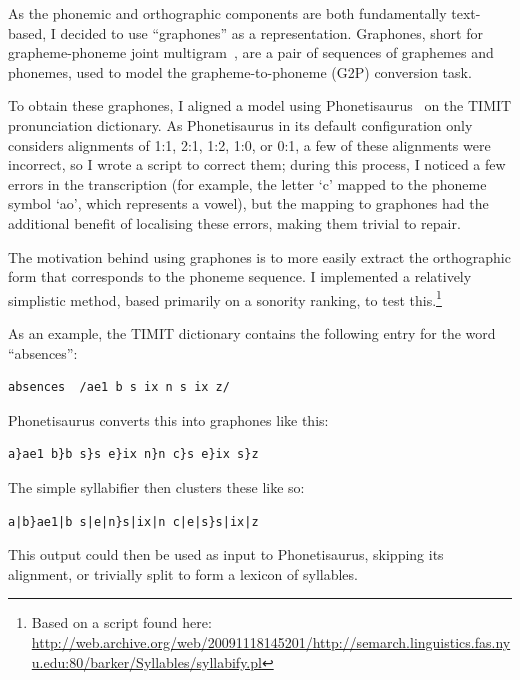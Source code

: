 \documentclass{article}[11pt]
\begin{document}
As the phonemic and orthographic components are both fundamentally text-based, I decided to use ``graphones'' as a representation. Graphones, short for grapheme-phoneme joint multigram~\citep{bisani_investigations_2002}, are a pair of sequences of graphemes and phonemes, used to model the grapheme-to-phoneme (G2P) conversion task.

To obtain these graphones, I aligned a model using Phonetisaurus~\citep{novak_phonetisaurus_2016} on the TIMIT pronunciation dictionary. As Phonetisaurus in its default configuration only considers alignments of 1:1, 2:1, 1:2, 1:0, or 0:1, a few of these alignments were incorrect, so I wrote a script to correct them; during this process, I noticed a few errors in the transcription (for example, the letter `c' mapped to the phoneme symbol `ao', which represents a vowel), but the mapping to graphones had the additional benefit of localising these errors, making them trivial to repair.

The motivation behind using graphones is to more easily extract the orthographic form that corresponds to the phoneme sequence. I implemented a relatively simplistic method, based primarily on a sonority ranking, to test this.\footnote{Based on a script found here: \url{http://web.archive.org/web/20091118145201/http://semarch.linguistics.fas.nyu.edu:80/barker/Syllables/syllabify.pl}}

As an example, the TIMIT dictionary contains the following entry for the word ``absences'':

\begin{verbatim}
absences  /ae1 b s ix n s ix z/
\end{verbatim}

Phonetisaurus converts this into graphones like this:

\begin{verbatim}
a}ae1 b}b s}s e}ix n}n c}s e}ix s}z
\end{verbatim}

The simple syllabifier then clusters these like so:

\begin{verbatim}
a|b}ae1|b s|e|n}s|ix|n c|e|s}s|ix|z
\end{verbatim}

This output could then be used as input to Phonetisaurus, skipping its alignment, or trivially split to form a lexicon of syllables.

\end{document}
